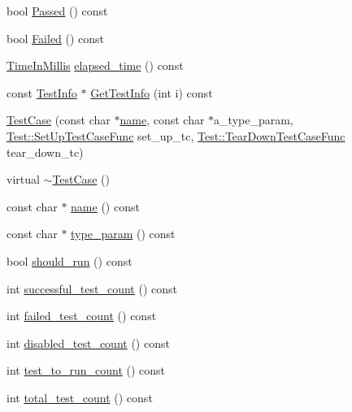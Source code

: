\begin{DoxyCompactItemize}
\item 
bool \hyperlink{classtesting_1_1TestCase_ac97d5073365af8a73262fd9f6bf18656}{\-Passed} () const 
\item 
bool \hyperlink{classtesting_1_1TestCase_a7cf078354304c964c1934f53bf2bb4d7}{\-Failed} () const 
\item 
\hyperlink{namespacetesting_a338e9fd9474f0d8fafcb28b05f66a630}{\-Time\-In\-Millis} \hyperlink{classtesting_1_1TestCase_a4f91886b546ea9cc5ba2d374a62f3a9c}{elapsed\-\_\-time} () const 
\item 
const \hyperlink{classtesting_1_1TestInfo}{\-Test\-Info} $\ast$ \hyperlink{classtesting_1_1TestCase_aae10a34f0c8f706d33844333c38f0d8a}{\-Get\-Test\-Info} (int i) const 
\item 
\hyperlink{classtesting_1_1TestCase_adf0dcf842d3506fd22c91de33f79df86}{\-Test\-Case} (const char $\ast$\hyperlink{classtesting_1_1TestCase_a862958aa3c2b9bf36903f1f0f2e81c54}{name}, const char $\ast$a\-\_\-type\-\_\-param, \hyperlink{classtesting_1_1Test_a2df065892efeff7ca91bb2d2fbe00975}{\-Test\-::\-Set\-Up\-Test\-Case\-Func} set\-\_\-up\-\_\-tc, \hyperlink{classtesting_1_1Test_a4ae7a4e140c70dee5c9cb82e13ae570c}{\-Test\-::\-Tear\-Down\-Test\-Case\-Func} tear\-\_\-down\-\_\-tc)
\item 
virtual \hyperlink{classtesting_1_1TestCase_acc72ca1291990751d79abe38f199bb3f}{$\sim$\-Test\-Case} ()
\item 
const char $\ast$ \hyperlink{classtesting_1_1TestCase_a862958aa3c2b9bf36903f1f0f2e81c54}{name} () const 
\item 
const char $\ast$ \hyperlink{classtesting_1_1TestCase_ad596248661b2f4017c041425fa4c8b10}{type\-\_\-param} () const 
\item 
bool \hyperlink{classtesting_1_1TestCase_ad82d0b35f1d10f27e8d03440f16ca467}{should\-\_\-run} () const 
\item 
int \hyperlink{classtesting_1_1TestCase_ab955f67bc1fe8ef62a7e72906ccece2a}{successful\-\_\-test\-\_\-count} () const 
\item 
int \hyperlink{classtesting_1_1TestCase_afd8bbd35c7ee99960abb321cfdff3119}{failed\-\_\-test\-\_\-count} () const 
\item 
int \hyperlink{classtesting_1_1TestCase_a10ec677118627074973fc20c9271b204}{disabled\-\_\-test\-\_\-count} () const 
\item 
int \hyperlink{classtesting_1_1TestCase_aa6eccf86072f4f8ddd0bea30dfd45912}{test\-\_\-to\-\_\-run\-\_\-count} () const 
\item 
int \hyperlink{classtesting_1_1TestCase_a0eb7286957aeb126d9926c33407a15a3}{total\-\_\-test\-\_\-count} () const 

\end{DoxyCompactItemize}
